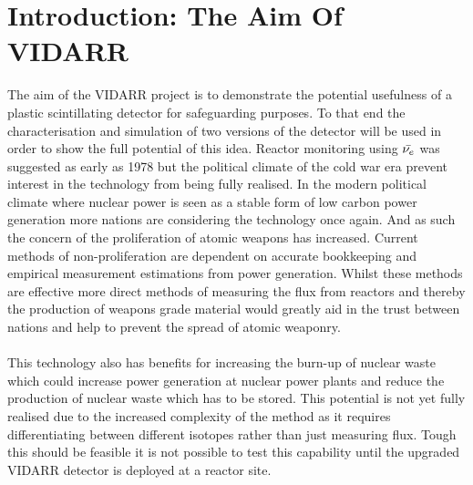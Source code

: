 
\chapter{Introduction: The Aim Of VIDARR} \label{Chap:theAimOfVidarr} %
The aim of the VIDARR project is to demonstrate the potential usefulness of a plastic scintillating detector for safeguarding purposes. To that end the characterisation and simulation of two versions of the detector will be used in order to show the full potential of this idea. Reactor monitoring using $\Bar{\nu_e}$ was suggested as early as 1978 \cite{Borovoi_1978} but the political climate of the cold war era prevent interest in the technology from being fully realised. In the modern political climate where nuclear power is seen as a stable form of low carbon power generation more nations are considering the technology once again. And as such the concern of the proliferation of atomic weapons has increased. Current methods of non-proliferation are dependent on accurate bookkeeping and empirical measurement estimations from power generation. Whilst these methods are effective more direct methods of measuring the flux from reactors and thereby the production of weapons grade material would greatly aid in the trust between nations and help to prevent the spread of atomic weaponry. 
\\\\This technology also has benefits for increasing the burn-up of nuclear waste which could increase power generation at nuclear power plants and reduce the production of nuclear waste which has to be stored. This potential is not yet fully realised due to the increased complexity of the method as it requires differentiating between different isotopes rather than just measuring flux. Tough this should be feasible it is not possible to test this capability until the upgraded VIDARR detector is deployed at a reactor site. 

\ifpdf
    \graphicspath{{Chapter1/Figs/Raster/}{Chapter1/Figs/PDF/}{Chapter1/Figs/}}
\else
    \graphicspath{{Chapter1/Figs/Vector/}{Chapter1/Figs/}}
\fi




